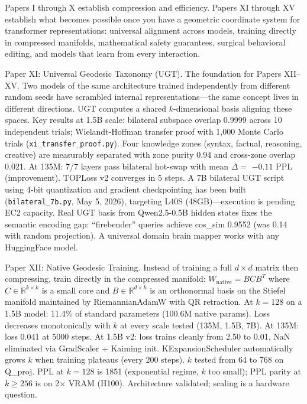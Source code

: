 \documentclass[11pt]{article}
\begin{document}
Papers I through X establish compression and efficiency. Papers XI through XV establish what becomes possible once you have a geometric coordinate system for transformer representations: universal alignment across models, training directly in compressed manifolds, mathematical safety guarantees, surgical behavioral editing, and models that learn from every interaction.

Paper XI: Universal Geodesic Taxonomy (UGT). The foundation for Papers XII--XV. Two models of the same architecture trained independently from different random seeds have scrambled internal representations---the same concept lives in different directions. UGT computes a shared $k$-dimensional basis aligning these spaces. Key results at 1.5B scale: bilateral subspace overlap 0.9999 across 10 independent trials; Wielandt-Hoffman transfer proof with 1,000 Monte Carlo trials (\texttt{xi\_transfer\_proof.py}). Four knowledge zones (syntax, factual, reasoning, creative) are measurably separated with zone purity 0.94 and cross-zone overlap 0.021. At 135M: 7/7 layers pass bilateral hot-swap with mean $\Delta =$ $-0.11$ PPL (improvement). TOPLoss v2 converges in 5 steps. A 7B bilateral UGT script using 4-bit quantization and gradient checkpointing has been built (\texttt{bilateral\_7b.py}, May 5, 2026), targeting L40S (48GB)---execution is pending EC2 capacity. Real UGT basis from Qwen2.5-0.5B hidden states fixes the semantic encoding gap: ``firebender'' queries achieve cos\_sim 0.9552 (was 0.14 with random projection). A universal domain brain mapper works with any HuggingFace model.

Paper XII: Native Geodesic Training. Instead of training a full $d \times d$ matrix then compressing, train directly in the compressed manifold: $W_{\mathrm{native}} = B C B^T$ where $C \in \mathbb{R}^{k \times k}$ is a small core and $B \in \mathbb{R}^{d \times k}$ is an orthonormal basis on the Stiefel manifold maintained by RiemannianAdamW with QR retraction. At $k = 128$ on a 1.5B model: 11.4\% of standard parameters (100.6M native params). Loss decreases monotonically with $k$ at every scale tested (135M, 1.5B, 7B). At 135M: loss 0.041 at 5000 steps. At 1.5B v2: loss trains cleanly from 2.50 to 0.01, NaN eliminated via GradScaler + Kaiming init. KExpansionScheduler automatically grows $k$ when training plateaus (every 200 steps). $k$ tested from 64 to 768 on Q\_proj. PPL at $k=128$ is 1851 (exponential regime, $k$ too small); PPL parity at $k \ge 256$ is on 2$\times$ VRAM (H100). Architecture validated; scaling is a hardware question.
\end{document}

